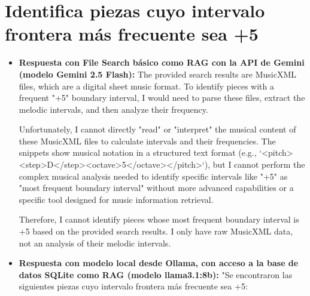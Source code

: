 \begin{itemize}
\end{itemize}

\section{Identifica piezas cuyo intervalo frontera más frecuente sea +5}
\begin{itemize}
    \item \textbf{Respuesta con File Search básico como RAG con la API de Gemini (modelo Gemini 2.5 Flash):} The provided search results are MusicXML files, which are a digital sheet music format. To identify pieces with a frequent "+5" boundary interval, I would need to parse these files, extract the melodic intervals, and then analyze their frequency.

Unfortunately, I cannot directly "read" or "interpret" the musical content of these MusicXML files to calculate intervals and their frequencies. The snippets show musical notation in a structured text format (e.g., `<pitch><step>D</step><octave>5</octave></pitch>`), but I cannot perform the complex musical analysis needed to identify specific intervals like "+5" as "most frequent boundary interval" without more advanced capabilities or a specific tool designed for music information retrieval.

Therefore, I cannot identify pieces whose most frequent boundary interval is +5 based on the provided search results. I only have raw MusicXML data, not an analysis of their melodic intervals.
    \item \textbf{Respuesta con modelo local desde Ollama, con acceso a la base de datos SQLite como RAG (modelo llama3.1:8b):} "Se encontraron las siguientes piezas cuyo intervalo frontera más frecuente sea +5:


\end{itemize}
